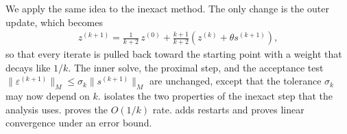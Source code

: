 We apply the same idea to the inexact method.
The only change is the outer update, which becomes
\begin{align}
    z^{(k+1)} = \frac{1}{k+2}\, z^{(0)} + \frac{k+1}{k+2}\left(z^{(k)} + \theta s^{(k+1)}\right), \label{eq:anchored-update}
\end{align}
so that every iterate is pulled back toward the starting point with a weight that decays like $1/k$.
The inner solve, the proximal step, and the acceptance test $\|\varepsilon^{(k+1)}\|_M \le \sigma_k \|s^{(k+1)}\|_M$ are unchanged, except that the tolerance $\sigma_k$ may now depend on $k$.
 isolates the two properties of the inexact step that the analysis uses.
 proves the $O(1/k)$ rate.
 adds restarts and proves linear convergence under an error bound.

